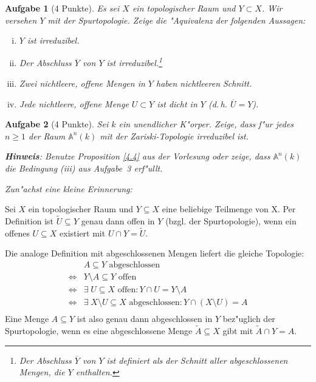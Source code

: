 \documentclass[a4paper, 12pt, numbers=noendperiod, chapterprefix=true]{scrbook}
\theoremstyle{break}
\newtheorem{Aufg}{Aufgabe}
\theoremstyle{nonumberbreak}
\theoremstyle{nonumberplain}
\newcommand{\A}{\mathbb{A}}
\newcommand{\Affine}{\mathbb{A}} %
\begin{document}
\begin{Aufg}[4 Punkte]
Es sei $X$ ein topologischer Raum und $Y\subset X$. Wir versehen $Y$ mit der Spurtopologie. Zeige die "Aquivalenz der folgenden Aussagen:
\begin{enumerate}[i)]
	\item $Y$ ist irreduzibel.
	\item Der Abschluss $\overline{Y}$ von $Y$ ist irreduzibel.\footnote{Der Abschluss $\overline{Y}$ von $Y$ ist definiert als der Schnitt aller abgeschlossenen Mengen, die $Y$ enthalten.}
	\item Zwei nichtleere, offene Mengen in $Y$ haben nichtleeren Schnitt.
	\item Jede nichtleere, offene Menge $U\subset Y$ ist dicht in $Y$ (d.\,h. $\overline{U} = Y$).
\end{enumerate}\end{Aufg}

\begin{Aufg}[4 Punkte]
Sei $k$ ein unendlicher K"orper. Zeige, dass f"ur jedes $n \geq 1$ der Raum $\Affine^n(k)$ mit der Zariski-Topologie irreduzibel ist.
 
\textbf{Hinweis}: Benutze Proposition \ref{4.4} aus der Vorlesung oder zeige, dass $\Affine^n(k)$ die Bedingung (iii) aus Aufgabe~3 erf"ullt.
\end{Aufg}

\emph{Zun"achst eine kleine Erinnerung:}

Sei $X$ ein topologischer Raum und $Y \subseteq X$ eine beliebige Teilmenge von X. Per Definition ist $\tilde{U} \subseteq Y$ genau dann offen in $Y$ (bzgl. der Spurtopologie), wenn ein offenes $U \subseteq X$ existiert mit $U \cap Y = \tilde{U}$.

Die analoge Definition mit abgeschlossenen Mengen liefert die gleiche Topologie:
	\[\begin{array}{ll}
		 &A \subseteq Y \textrm{ abgeschlossen }\\
		\Leftrightarrow & Y \setminus A \subseteq Y \textrm{ offen}\\
		\Leftrightarrow & \exists \; U \subseteq X \textrm{ offen}: Y \cap U = Y \setminus A\\
		\Leftrightarrow & \exists \; X \setminus U \subseteq X \textrm{ abgeschlossen} : Y \cap (X\setminus U) = A\\
	\end{array}\]
Eine Menge $A \subseteq Y$ ist also genau dann abgeschlossen in $Y$ bez"uglich der Spurtopologie, wenn es eine abgeschlossene Menge $\tilde{A} \subseteq X$ gibt mit $\tilde{A} \cap Y = A$.
\end{document}
